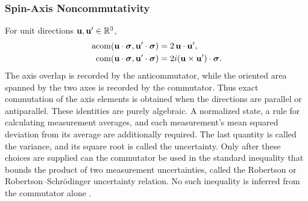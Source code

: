 \subsubsection{Spin-Axis Noncommutativity}
For unit directions \(\mathbf{u},\mathbf{u}'\in\mathbb{R}^3\),
\begin{align*}
\operatorname{acom}\!\left(\mathbf{u}\cdot\mathbf{\bm{\sigma}},\mathbf{u}'\cdot\mathbf{\bm{\sigma}}\right)
&=2\,\mathbf{u}\cdot\mathbf{u}',\\
\operatorname{com}\!\left(\mathbf{u}\cdot\mathbf{\bm{\sigma}},\mathbf{u}'\cdot\mathbf{\bm{\sigma}}\right)
&=2i(\mathbf{u}\times\mathbf{u}')\cdot\mathbf{\bm{\sigma}}.
\end{align*}
The axis overlap is recorded by the anticommutator, while the oriented area
spanned by the two axes is recorded by the commutator. Thus exact commutation
of the axis elements is obtained when the directions are parallel or
antiparallel. These identities are purely algebraic. A normalized state,
a rule for calculating measurement averages, and each measurement's mean
squared deviation from its average are additionally required. The last
quantity is called the variance, and its square root is called the
uncertainty. Only after these choices are supplied can
the commutator be used in the standard inequality that bounds the product
of two measurement uncertainties, called the Robertson or
Robertson--Schr\"odinger uncertainty relation. No such inequality is
inferred from the commutator alone \cite{robertson1929}.
